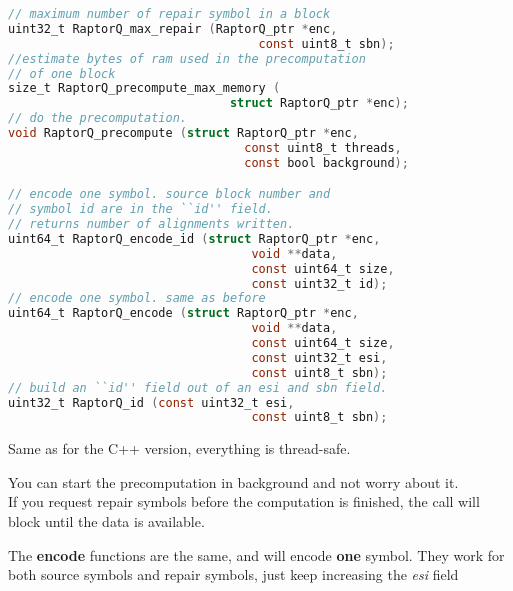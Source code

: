\documentclass[11pt,a4paper]{refart}
\begin{document}

\begin{lstlisting}[language=C]
// maximum number of repair symbol in a block
uint32_t RaptorQ_max_repair (RaptorQ_ptr *enc,
                                   const uint8_t sbn);
//estimate bytes of ram used in the precomputation
// of one block
size_t RaptorQ_precompute_max_memory (
                               struct RaptorQ_ptr *enc);
// do the precomputation.
void RaptorQ_precompute (struct RaptorQ_ptr *enc,
                                 const uint8_t threads,
                                 const bool background);

// encode one symbol. source block number and
// symbol id are in the ``id'' field.
// returns number of alignments written.
uint64_t RaptorQ_encode_id (struct RaptorQ_ptr *enc,
                                  void **data,
                                  const uint64_t size,
                                  const uint32_t id);
// encode one symbol. same as before
uint64_t RaptorQ_encode (struct RaptorQ_ptr *enc,
                                  void **data,
                                  const uint64_t size,
                                  const uint32_t esi,
                                  const uint8_t sbn);
// build an ``id'' field out of an esi and sbn field.
uint32_t RaptorQ_id (const uint32_t esi,
                                  const uint8_t sbn);
\end{lstlisting}
Same as for the C++ version, everything is thread-safe.

You can start the precomputation in background and not worry about it.\\
If you request repair symbols before the computation is finished, the call will block until the data is available.

The \textbf{encode} functions are the same, and will encode \textbf{one} symbol.
They work for both source symbols and repair symbols, just keep increasing the \textit{esi} field


\newpage
\end{document}
